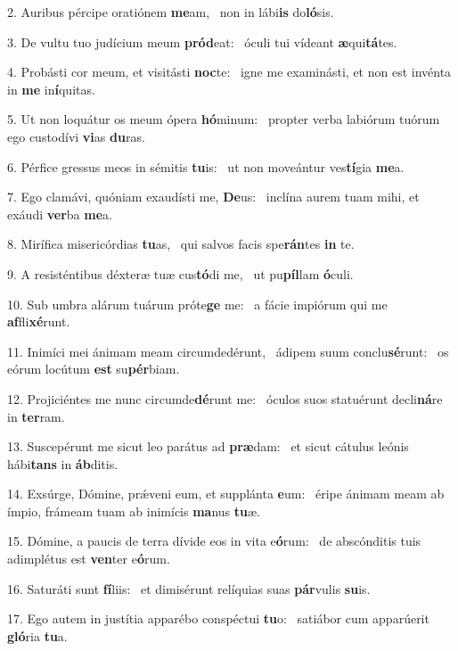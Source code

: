 2. Auribus pércipe oratiónem \textbf{me}am, \ast\  non in lábi\textbf{is} do\textbf{ló}sis.\

3. De vultu tuo judícium meum \textbf{pród}eat: \ast\  óculi tui vídeant \textbf{æ}qui\textbf{tá}tes.\

4. Probásti cor meum, et visitásti \textbf{noc}te: \ast\  igne me examinásti, et non est invénta in \textbf{me} in\textbf{í}quitas.\

5. Ut non loquátur os meum ópera \textbf{hó}minum: \ast\  propter verba labiórum tuórum ego custodívi \textbf{vi}as \textbf{du}ras.\

6. Pérfice gressus meos in sémitis \textbf{tu}is: \ast\  ut non moveántur ves\textbf{tí}gia \textbf{me}a.\

7. Ego clamávi, quóniam exaudísti me, \textbf{De}us: \ast\  inclína aurem tuam mihi, et exáudi \textbf{ver}ba \textbf{me}a.\

8. Mirífica misericórdias \textbf{tu}as, \ast\  qui salvos facis spe\textbf{rán}tes \textbf{in} te.\

9. A resisténtibus déxteræ tuæ cus\textbf{tó}di me, \ast\  ut pu\textbf{píl}lam \textbf{ó}culi.\

10. Sub umbra alárum tuárum próte\textbf{ge} me: \ast\  a fácie impiórum qui me \textbf{af}fli\textbf{xé}runt.\

11. Inimíci mei ánimam meam circumdedérunt, \dag\  ádipem suum conclu\textbf{sé}runt: \ast\  os eórum locútum \textbf{est} su\textbf{pér}biam.\

12. Projiciéntes me nunc circumde\textbf{dé}runt me: \ast\  óculos suos statuérunt decli\textbf{ná}re in \textbf{ter}ram.\

13. Suscepérunt me sicut leo parátus ad \textbf{præ}dam: \ast\  et sicut cátulus leónis hábi\textbf{tans} in \textbf{áb}ditis.\

14. Exsúrge, Dómine, prǽveni eum, et supplánta \textbf{e}um: \ast\  éripe ánimam meam ab ímpio, frámeam tuam ab inimícis \textbf{ma}nus \textbf{tu}æ.\

15. Dómine, a paucis de terra dívide eos in vita e\textbf{ó}rum: \ast\  de abscónditis tuis adimplétus est \textbf{ven}ter e\textbf{ó}rum.\

16. Saturáti sunt \textbf{fí}liis: \ast\  et dimisérunt relíquias suas \textbf{pár}vulis \textbf{su}is.\

17. Ego autem in justítia apparébo conspéctui \textbf{tu}o: \ast\  satiábor cum apparúerit \textbf{gló}ria \textbf{tu}a.\

